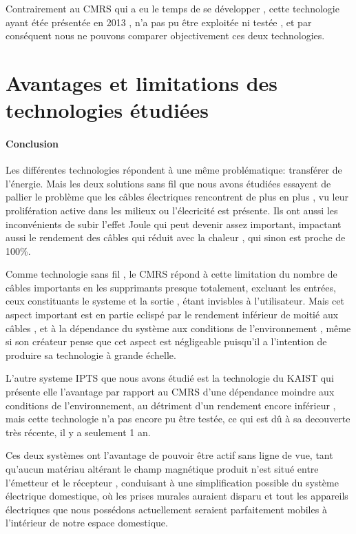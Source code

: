\documentclass[12pt]{report}
\begin{document}
  Contrairement au CMRS qui a eu le temps de se développer , cette technologie ayant étée présentée en 2013 , n'a pas pu être exploitée ni testée , et par conséquent nous ne pouvons comparer objectivement ces deux technologies.
\section{Avantages et limitations des technologies étudiées}

\paragraph{Conclusion}  Les différentes technologies répondent à une même problématique: transférer de l'énergie. Mais les deux solutions sans fil que nous avons étudiées essayent de pallier le problème que les câbles électriques rencontrent de plus en plus , vu leur prolifération active dans les milieux ou l'élecricité est présente. Ils ont aussi les inconvénients de subir l'effet Joule qui peut devenir assez important, impactant aussi le rendement des câbles qui réduit avec la chaleur , qui sinon est proche de 100\%.

  Comme technologie sans fil , le CMRS répond à cette limitation du nombre de câbles importants en les supprimants presque totalement, excluant les entrées, ceux constituants le systeme et la sortie , étant invisbles à l'utilisateur. Mais cet aspect important est en partie eclispé par le rendement inférieur de moitié aux câbles , et à la dépendance du système aux conditions de l'environnement , même si son créateur pense que cet aspect est négligeable puisqu'il a l'intention de produire sa technologie à grande échelle.
  
  L'autre systeme IPTS que nous avons étudié est la technologie du KAIST qui présente elle l'avantage par rapport au CMRS d'une dépendance moindre aux conditions de l'environnement, au détriment d'un rendement encore inférieur , mais cette technologie n'a pas encore pu être testée, ce qui est dû à sa decouverte très récente, il y a seulement 1 an.
  
  Ces deux systèmes ont l'avantage de pouvoir être actif sans ligne de vue, tant qu'aucun matériau altérant le champ magnétique produit n'est situé entre l'émetteur et le récepteur , conduisant à une simplification possible du système électrique domestique, où les prises murales auraient disparu et tout les appareils électriques que nous possédons actuellement seraient parfaitement mobiles à l'intérieur de notre espace domestique.
  
\end{document}
